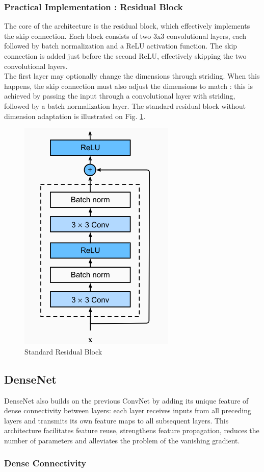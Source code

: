 \documentclass[twocolumn,superscriptaddress,aps]{revtex4-1}
\begin{document}
\subsubsection{Practical Implementation : Residual Block}

The core of the architecture is the residual block, which effectively implements the skip connection. Each block consists of two 3x3 convolutional layers, each followed by batch normalization and a ReLU activation function. The skip connection is added just before the second ReLU, effectively skipping the two convolutional layers.\\
The first layer may optionally change the dimensions through striding. When this happens, the skip connection must also adjust the dimensions to match : this is achieved by passing the input through a convolutional layer with striding, followed by a batch normalization layer. The standard residual block without dimension adaptation is illustrated on Fig. \ref{fig:residual_block}. 
\begin{figure}[hbtp]
    \centering
    \includegraphics[width = 0.25 \textwidth]{images/residual_block.png}
    \caption{Standard Residual Block}
    \label{fig:residual_block}
\end{figure}


\subsection{DenseNet}

DenseNet also builds on the previous ConvNet by adding its unique feature of dense connectivity between layers: each layer receives inputs from all preceding layers and transmits its own feature maps to all subsequent layers. This architecture facilitates feature reuse, strengthens feature propagation, reduces the number of parameters and alleviates the problem of the vanishing gradient\cite{denset}.

\subsubsection{Dense Connectivity}
\end{document}
